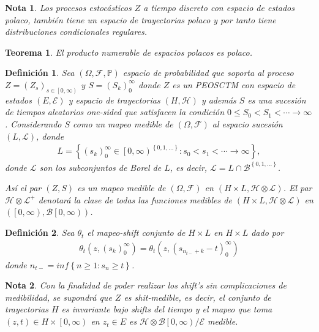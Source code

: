 \documentclass{article}
\newtheorem{Def}{Definición}
\newtheorem{Teo}{Teorema}
\newtheorem{Note}{Nota}
\newcommand{\prob}{\mathbb{P}}
\begin{document}
\begin{Note}
Los procesos estoc\'asticos $Z$ a tiempo discreto con espacio de estados polaco, tambi\'en tiene un espacio de trayectorias polaco y por tanto tiene distribuciones condicionales regulares.
\end{Note}

\begin{Teo}
El producto numerable de espacios polacos es polaco.
\end{Teo}


\begin{Def}
Sea $\left(\Omega,\mathcal{F},\prob\right)$ espacio de probabilidad que soporta al proceso $Z=\left(Z_{s}\right)_{s\in\left[0,\infty\right)}$ y $S=\left(S_{k}\right)_{0}^{\infty}$ donde $Z$ es un PEOSCTM con espacio de estados $\left(E,\mathcal{E}\right)$  y espacio de trayectorias $\left(H,\mathcal{H}\right)$  y adem\'as $S$ es una sucesi\'on de tiempos aleatorios one-sided que satisfacen la condici\'on $0\leq S_{0}<S_{1}<\cdots\rightarrow\infty$. Considerando $S$ como un mapeo medible de $\left(\Omega,\mathcal{F}\right)$ al espacio sucesi\'on $\left(L,\mathcal{L}\right)$, donde 
\begin{eqnarray*}
L=\left\{\left(s_{k}\right)_{0}^{\infty}\in\left[0,\infty\right)^{\left\{0,1,\ldots\right\}}:s_{0}<s_{1}<\cdots\rightarrow\infty\right\},
\end{eqnarray*}
donde $\mathcal{L}$ son los subconjuntos de Borel de $L$, es decir, $\mathcal{L}=L\cap\mathcal{B}^{\left\{0,1,\ldots\right\}}$.

As\'i el par $\left(Z,S\right)$ es un mapeo medible de  $\left(\Omega,\mathcal{F}\right)$ en $\left(H\times L,\mathcal{H}\otimes\mathcal{L}\right)$. El par $\mathcal{H}\otimes\mathcal{L}^{+}$ denotar\'a la clase de todas las funciones medibles de $\left(H\times L,\mathcal{H}\otimes\mathcal{L}\right)$ en $\left(\left[0,\infty\right),\mathcal{B}\left[0,\infty\right)\right)$.
\end{Def}


\begin{Def}
Sea $\theta_{t}$ el mapeo-shift conjunto de $H\times L$ en $H\times L$ dado por
\begin{eqnarray*}
\theta_{t}\left(z,\left(s_{k}\right)_{0}^{\infty}\right)=\theta_{t}\left(z,\left(s_{n_{t-}+k}-t\right)_{0}^{\infty}\right)
\end{eqnarray*}
donde 
$n_{t-}=inf\left\{n\geq1:s_{n}\geq t\right\}$.
\end{Def}

\begin{Note}
Con la finalidad de poder realizar los shift's sin complicaciones de medibilidad, se supondr\'a que $Z$ es shit-medible, es decir, el conjunto de trayectorias $H$ es invariante bajo shifts del tiempo y el mapeo que toma $\left(z,t\right)\in H\times\left[0,\infty\right)$ en $z_{t}\in E$ es $\mathcal{H}\otimes\mathcal{B}\left[0,\infty\right)/\mathcal{E}$ medible.
\end{Note}
\end{document}
